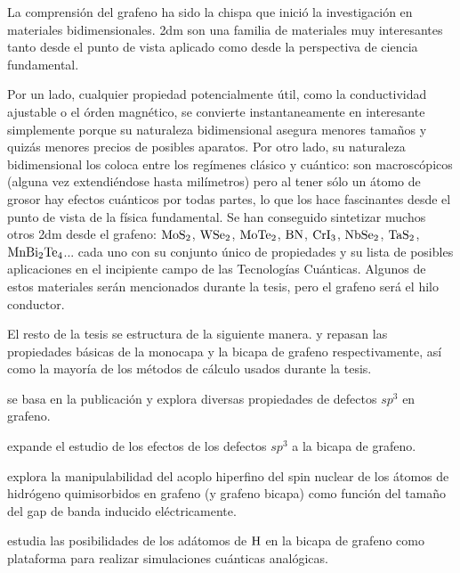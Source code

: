 La comprensión del grafeno ha sido la chispa que inició la investigación en materiales bidimensionales. \ac{2dm} son una familia de materiales muy interesantes tanto desde el punto de vista aplicado como desde la perspectiva de ciencia fundamental.

Por un lado, cualquier propiedad potencialmente útil, como la conductividad ajustable o el órden magnético, se convierte instantaneamente en interesante simplemente porque su naturaleza bidimensional asegura menores tamaños y quizás menores precios de posibles aparatos.
Por otro lado, su naturaleza bidimensional los coloca entre los regímenes clásico y cuántico: son macroscópicos (alguna vez extendiéndose hasta milímetros) pero al tener sólo un átomo de grosor hay efectos cuánticos por todas partes, lo que los hace fascinantes desde el punto de vista de la física fundamental.
Se han conseguido sintetizar muchos otros \ac{2dm} desde el grafeno: $\ce{MoS2}$, $\ce{WSe2}$, $\ce{MoTe2}$, $\ce{BN}$, $\ce{CrI3}$, $\ce{NbSe2}$, $\ce{TaS2}$, $\ce{MnBi2Te4}$... cada uno con su conjunto único de propiedades y su lista de posibles aplicaciones en el incipiente campo de las Tecnologías Cuánticas.
Algunos de estos materiales serán mencionados durante la tesis, pero el grafeno será el hilo conductor.
\bigskip

El resto de la tesis se estructura de la siguiente manera.  y  repasan las propiedades básicas de la monocapa y la bicapa de grafeno respectivamente, así como la mayoría de los métodos de cálculo usados durante la tesis.

 se basa en la publicación y explora diversas propiedades de defectos $sp^3$ en grafeno.

 expande el estudio de los efectos de los defectos $sp^3$ a la bicapa de grafeno.

 explora la manipulabilidad del acoplo hiperfino del spin nuclear de los átomos de hidrógeno quimisorbidos en grafeno (y grafeno bicapa) como función del tamaño del gap de banda inducido eléctricamente.

 estudia las posibilidades de los adátomos de $\ce{H}$ en la bicapa de grafeno como plataforma para realizar simulaciones cuánticas analógicas.
